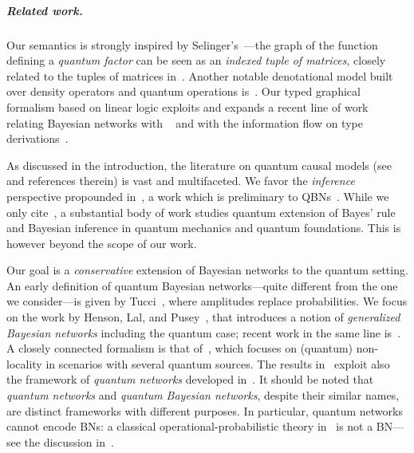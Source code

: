 \subparagraph{Related work.}

Our semantics is strongly inspired by Selinger's~\cite{Selinger2004}---the graph of the function defining a \emph{quantum factor} can be seen as an \emph{indexed tuple of matrices}, closely related to the tuples of matrices in~\cite{Selinger2004}.
Another notable denotational model built over density operators and quantum operations is~\cite{HasuoH17}.
Our typed graphical formalism based on linear logic exploits and expands a recent line of work relating Bayesian networks with \pns~\cite{EhrhardFP23,BPN} and with the information flow on type derivations~\cite{popl24}. 

As discussed in the introduction, the literature on quantum causal models (see \eg~\cite{BarrettLorenzOreshkov2019} and references therein) is vast and multifaceted.
We favor the \emph{inference} perspective propounded in~\cite{LeiferSpekkens2013}, a work which is preliminary to QBNs~\cite{GBN2014}.
While we only cite~\cite{LeiferSpekkens2013}, a substantial body of work studies quantum extension of Bayes' rule and Bayesian inference in quantum mechanics and quantum foundations.
This is however beyond the scope of our work.

Our goal is a \emph{conservative} extension of Bayesian networks to the quantum setting.
An early definition of quantum Bayesian networks---quite different from the one we consider---is given by Tucci~\cite{Tucci1995}, where amplitudes replace probabilities.
We focus on the work by Henson, Lal, and Pusey~\cite{GBN2014}, that introduces a notion of \emph{generalized Bayesian networks} including the quantum case; recent work in the same line is~\cite{KhannaAnsanelliPuseyWolfe2024}.
A closely connected formalism is that of~\cite{Fritz2012}, which focuses on (quantum) non-locality in scenarios with several quantum sources.
The results in~\cite{GBN2014} exploit also the framework of \emph{quantum networks} developed in~\cite{10.1103/PhysRevA.80.022339}.
It should be noted that \emph{quantum networks} and \emph{quantum Bayesian networks}, despite their similar names, are distinct frameworks with different purposes.
In particular, quantum networks cannot encode BNs: a classical operational-probabilistic theory in~\cite{10.1103/PhysRevA.80.022339} is not a BN---see the discussion in~\cite[Section~3.1 and Example~10]{GBN2014}.

